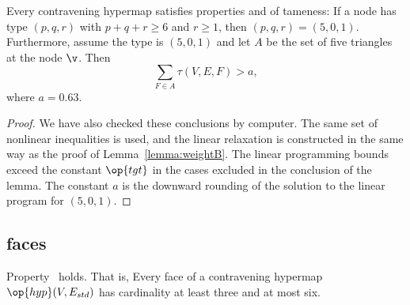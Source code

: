 \begin{lemma}[]\label{lemma:degE}
  Every contravening hypermap satisfies properties 
  and 
of tameness: 
If a node has type $(p,q,r)$ with $p+q+r\ge 6$ and $r\ge 1$, then $(p,q,r)=(5,0,1)$. 
Furthermore, assume the type is $(5,0,1)$ and let $A$ be the set of five triangles at the
node $\v$.  Then
%
\[ 
\sum_{F\in A} \tau(V,E,F) > a,
\] 
where $a=0.63$.
\end{lemma}



\begin{proof}  We have also checked these conclusions by computer.
  The same set of nonlinear inequalities is used, and the linear
  relaxation is constructed in the same way as the proof of Lemma~\ref{lemma:weightB}.  The linear programming
  bounds exceed the constant $\op{tgt}$ in the cases excluded in the
  conclusion of the lemma.  The constant $a$ is the downward rounding
  of the solution to the linear program for $(5,0,1)$.
\end{proof}
%

%

\subsection{faces}



\begin{lemma}[]  \label{lemma:face-size}
  Property~ holds.  That is, Every face of a
  contravening hypermap $\op{hyp}(V,E_{std})$ has cardinality at least
  three and at most six.
\end{lemma}

